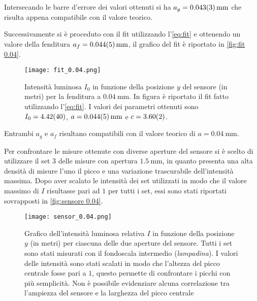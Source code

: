 \documentclass[../main.tex]{subfiles}
\begin{document}
Intersecando le barre d'errore dei valori ottenuti si ha $a_g = \qty{0.043+-0.003}{\mm}$ che risulta appena compatibile con il valore teorico.



\newpage

Successivamente si è proceduto con il fit utilizzando l'\autoref{eq:fit} e ottenendo un valore della fenditura $a_f = \qty{0.044+-0.005}{\mm}$, il grafico del fit è riportato in \autoref{fig:fit 0.04}.

\begin{figure}[ht!]
    \centering
    \texttt{[image: fit\_0.04.png]}
    \caption{Intensità luminosa $I_{0}$ in funzione della posizione $y$ del sensore (in metri) per la fenditura a $\qty{0.04}{\mm}$. In figura è riportato il fit fatto utilizzando l'\autoref{eq:fit}. I valori dei parametri ottenuti sono $I_{0} = \num{4.42+-0.4}$, $a = \qty{0.044+-0.005}{\mm}$ e $c = \num{3.60+-0.02}$. }
    \label{fig:fit 0.04}
\end{figure}

Entrambi $a_g$ e $a_f$ risultano compatibili con il valore teorico di $a = \qty{0.04}{\mm}$.

Per confrontare le misure ottenute con diverse aperture del sensore si è scelto di utilizzare il set $3$ delle misure con apertura $\qty{1.5}{\mm}$, in quanto presenta una alta densità di misure l'uno il picco e una variazione trascurabile dell'intensità massima. Dopo aver scalato le intensità dei set utilizzati in modo che il valore massimo di $I$ risultasse pari ad $1$ per tutti i set, essi sono stati riportati sovrapposti in \autoref{fig:sensore 0.04}.

\begin{figure}[ht!]
    \centering
    \texttt{[image: sensor\_0.04.png]}
    \caption{Grafico dell'intensità luminosa relativa $I$ in funzione della posizione $y$ (in metri) per ciascuna delle due aperture del sensore.
    Tutti i set sono stati misurati con il fondoscala intermedio (\textit{lampadina}). I valori delle intensità sono stati scalati in modo che l'altezza del picco centrale fosse pari a $1$, questo permette di confrontare i picchi con più semplicità.
    Non è possibile evidenziare alcuna correlazione tra l'ampiezza del sensore e la larghezza del picco centrale} %
    \label{fig:sensore 0.04}
\end{figure}
\end{document}
